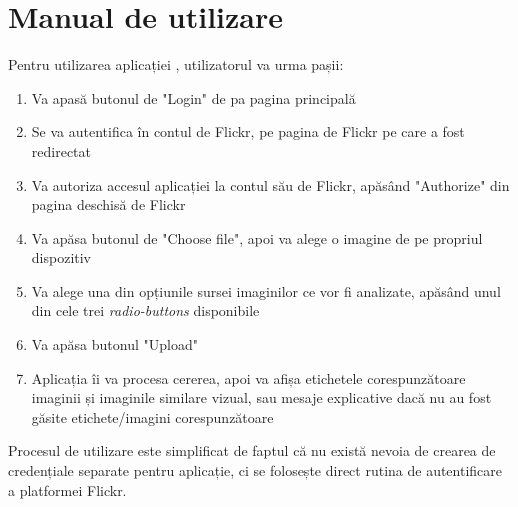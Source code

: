 \chapter{Manual de utilizare}

Pentru utilizarea aplicației {\applicationtitle}, utilizatorul va urma pașii:
\begin{enumerate}
    \item Va apasă butonul de "Login" de pa pagina principală
    \item Se va autentifica în contul de Flickr, pe pagina de Flickr pe care a fost redirectat
    \item Va autoriza accesul aplicației la contul său de Flickr, apăsând "Authorize" din pagina deschisă de Flickr
    \item Va apăsa butonul de "Choose file", apoi va alege o imagine de pe propriul dispozitiv
    \item Va alege una din opțiunile sursei imaginilor ce vor fi analizate, apăsând unul din cele trei \textit{radio-buttons} disponibile
    \item Va apăsa butonul "Upload"
    \item Aplicația îi va procesa cererea, apoi va afișa etichetele corespunzătoare imaginii și imaginile similare vizual, sau mesaje explicative dacă nu au fost găsite etichete/imagini corespunzătoare
\end{enumerate}{}

Procesul de utilizare  este simplificat de faptul că nu există nevoia de crearea de credențiale separate pentru aplicație, ci se folosește direct rutina de autentificare a platformei Flickr. 